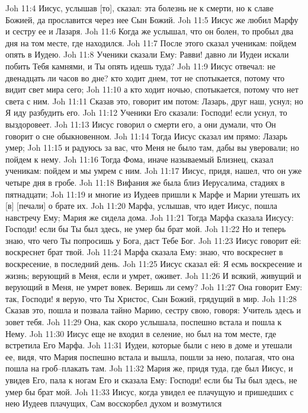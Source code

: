 Joh 11:4  Иисус, услышав [то], сказал: эта болезнь не к смерти, но к славе Божией, да прославится через нее Сын Божий.
Joh 11:5  Иисус же любил Марфу и сестру ее и Лазаря.
Joh 11:6  Когда же услышал, что он болен, то пробыл два дня на том месте, где находился.
Joh 11:7  После этого сказал ученикам: пойдем опять в Иудею.
Joh 11:8  Ученики сказали Ему: Равви! давно ли Иудеи искали побить Тебя камнями, и Ты опять идешь туда?
Joh 11:9  Иисус отвечал: не двенадцать ли часов во дне? кто ходит днем, тот не спотыкается, потому что видит свет мира сего;
Joh 11:10  а кто ходит ночью, спотыкается, потому что нет света с ним.
Joh 11:11  Сказав это, говорит им потом: Лазарь, друг наш, уснул; но Я иду разбудить его.
Joh 11:12  Ученики Его сказали: Господи! если уснул, то выздоровеет.
Joh 11:13  Иисус говорил о смерти его, а они думали, что Он говорит о сне обыкновенном.
Joh 11:14  Тогда Иисус сказал им прямо: Лазарь умер;
Joh 11:15  и радуюсь за вас, что Меня не было там, дабы вы уверовали; но пойдем к нему.
Joh 11:16  Тогда Фома, иначе называемый Близнец, сказал ученикам: пойдем и мы умрем с ним.
Joh 11:17  Иисус, придя, нашел, что он уже четыре дня в гробе.
Joh 11:18  Вифания же была близ Иерусалима, стадиях в пятнадцати;
Joh 11:19  и многие из Иудеев пришли к Марфе и Марии утешать их [в] [печали] о брате их.
Joh 11:20  Марфа, услышав, что идет Иисус, пошла навстречу Ему; Мария же сидела дома.
Joh 11:21  Тогда Марфа сказала Иисусу: Господи! если бы Ты был здесь, не умер бы брат мой.
Joh 11:22  Но и теперь знаю, что чего Ты попросишь у Бога, даст Тебе Бог.
Joh 11:23  Иисус говорит ей: воскреснет брат твой.
Joh 11:24  Марфа сказала Ему: знаю, что воскреснет в воскресение, в последний день.
Joh 11:25  Иисус сказал ей: Я есмь воскресение и жизнь; верующий в Меня, если и умрет, оживет.
Joh 11:26  И всякий, живущий и верующий в Меня, не умрет вовек. Веришь ли сему?
Joh 11:27  Она говорит Ему: так, Господи! я верую, что Ты Христос, Сын Божий, грядущий в мир.
Joh 11:28  Сказав это, пошла и позвала тайно Марию, сестру свою, говоря: Учитель здесь и зовет тебя.
Joh 11:29  Она, как скоро услышала, поспешно встала и пошла к Нему.
Joh 11:30  Иисус еще не входил в селение, но был на том месте, где встретила Его Марфа.
Joh 11:31  Иудеи, которые были с нею в доме и утешали ее, видя, что Мария поспешно встала и вышла, пошли за нею, полагая, что она пошла на гроб--плакать там.
Joh 11:32  Мария же, придя туда, где был Иисус, и увидев Его, пала к ногам Его и сказала Ему: Господи! если бы Ты был здесь, не умер бы брат мой.
Joh 11:33  Иисус, когда увидел ее плачущую и пришедших с нею Иудеев плачущих, Сам восскорбел духом и возмутился
